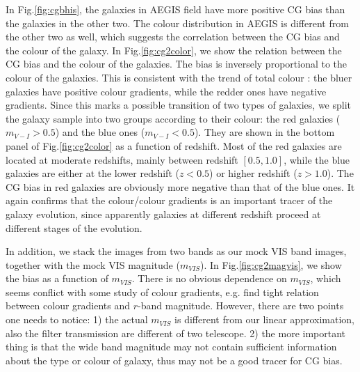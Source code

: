 \documentclass[useAMS,usenatbib]{mnras}
\begin{document}
In Fig.\ref{fig:cgbhis}, the galaxies in AEGIS field have more
positive CG bias than the galaxies in the other two. The colour
distribution in AEGIS is different from the other two as well, which
suggests the correlation between the CG bias and the colour of the
galaxy. In Fig.\ref{fig:cg2color}, we show the relation between the CG
bias and the colour of the galaxies. The bias is inversely
proportional to the colour of the galaxies. This is consistent with
the trend of total colour \citep[e.g.][]{2010MNRAS.407..144T}: the
bluer galaxies have positive colour gradients, while the redder ones
have negative gradients. Since this marks a possible transition of two
types of galaxies, we split the galaxy sample into two groups
according to their colour: the red galaxies ($m_{V-I}>0.5$) and the
blue ones ($m_{V-I}<0.5$). They are shown in the bottom panel of
Fig.\ref{fig:cg2color} as a function of redshift. Most of the red
galaxies are located at moderate redshifts, mainly between redshift
$[0.5,1.0]$, while the blue galaxies are either at the lower redshift
($z<0.5$) or higher redshift ($z>1.0$). The CG bias in red galaxies
are obviously more negative than that of the blue ones. It again
confirms that the colour/colour gradients is an important tracer of
the galaxy evolution, since apparently galaxies at different redshift
proceed at different stages of the evolution.

In addition, we stack the images from two bands as our mock VIS band
images, together with the mock VIS magnitude ($m_{VIS}$).  In
Fig.\ref{fig:cg2magvis}, we show the bias as a function of
$m_{VIS}$. There is no obvious dependence on $m_{VIS}$, which seems
conflict with some study of colour gradients,
e.g. \citet{2010MNRAS.407..144T} find tight relation between colour
gradients and $r$-band magnitude. However, there are two points one
needs to notice: 1) the actual $m_{VIS}$ is different from our linear
approximation, also the filter transmission are different of two
telescope. 2) the more important thing is that the wide band magnitude
may not contain sufficient information about the type or colour of
galaxy, thus may not be a good tracer for CG bias.
\end{document}
